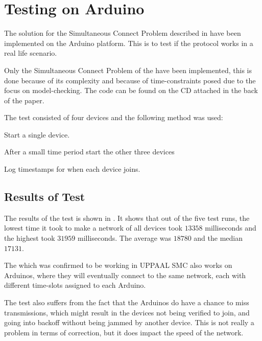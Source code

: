 \section{Testing on Arduino}\label{sec:ccrc_test}
The solution for the Simultaneous Connect Problem described in  have been implemented on the Arduino platform.
This is to test if the protocol works in a real life scenario. 

Only the Simultaneous Connect Problem of the  have been implemented, this is done because of its complexity and because of time-constraints posed due to the focus on model-checking.
The code can be found on the CD attached in the back of the paper.

The test consisted of four devices and the following method was used:
\begin{eletterate}
	\item Start a single device.
	\item After a small time period start the other three devices
	\item Log timestamps for when each device joins.
\end{eletterate}

\subsection{Results of Test}
The results of the test is shown in .
It shows that out of the five test runs, the lowest time it took to make a network of all devices took $13 358$ milliseconds and the highest took $31 959$ milliseconds.
The average was $18780$ and the median $17131$.

The  which was confirmed to be working in UPPAAL SMC also works on Arduinos, where they will eventually connect to the same network, each with different time-slots assigned to each Arduino.

The test also suffers from the fact that the Arduinos do have a chance to miss transmissions, which might result in the devices not being verified to join, and going into backoff without being jammed by another device.
This is not really a problem in terms of correction, but it does impact the speed of the network.

